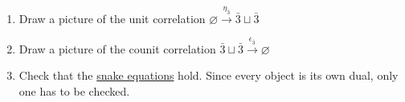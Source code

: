 \begin{enumerate}
    \item Draw a picture of the unit correlation $\varnothing \xrightarrow{\eta_{\bar 3}} \bar 3 \sqcup \bar 3$
    \item Draw a picture of the counit correlation $\bar 3 \sqcup \bar 3 \xrightarrow{\epsilon_{\bar 3}} \varnothing$
    \item Check that the \href{doc/1 math/Seven Sketches in Compositionality/Chapter 4: Co-design/5 Profunctors form a compact closed category/1 Compact closed categories/1 Dual object in a SMC}{snake equations} hold. Since every object is its own dual, only one has to be checked.
  \end{enumerate}